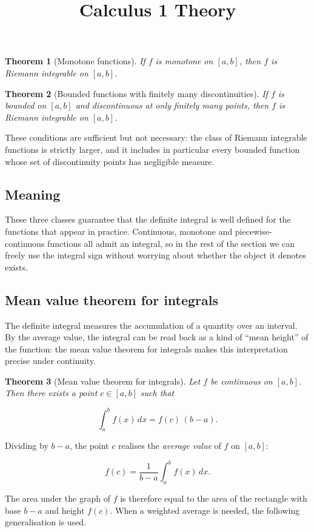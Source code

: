 \documentclass[11pt,a4paper]{article} \usepackage[T1]{fontenc}
\theoremstyle{plain} \newtheorem{theorem}{Theorem} \title{Calculus 1 Theory}
\begin{document}
\begin{theorem}
[Monotone functions] If $f$ is monotone on $[a,b]$, then $f$ is Riemann
integrable on $[a,b]$.
\end{theorem}

\begin{theorem}
[Bounded functions with finitely many discontinuities] If $f$ is bounded on
$[a,b]$ and discontinuous at only finitely many points, then $f$ is Riemann
integrable on $[a,b]$.
\end{theorem}

These conditions are sufficient but not necessary: the class of Riemann
integrable functions is strictly larger, and it includes in particular every
bounded function whose set of discontinuity points has negligible measure.

\subsection*{Meaning}

These three classes guarantee that the definite integral is well defined for
the functions that appear in practice. Continuous, monotone and
piecewise-continuous functions all admit an integral, so in the rest of the
section we can freely use the integral sign without worrying about whether the
object it denotes exists.

\subsection {Mean value theorem for integrals}

The definite integral measures the accumulation of a quantity over an interval.
By the average value, the integral can be read back as a kind of ``mean
height'' of the function: the mean value theorem for integrals makes this
interpretation precise under continuity.

\begin{theorem}
[Mean value theorem for integrals] Let $f$ be continuous on $[a,b]$. Then there
exists a point $c\in[a,b]$ such that

\[
\int_a^b f(x)\,dx = f(c)\,(b-a).
\]

\end{theorem}

Dividing by $b-a$, the point $c$ realises the \emph{average value} of $f$ on
$[a,b]$:

\[
f(c) = \frac{1}{b-a}\int_a^b f(x)\,dx.
\]

The area under the graph of $f$ is therefore equal to the area of the rectangle
with base $b-a$ and height $f(c)$. When a weighted average is needed, the
following generalisation is used.
\end{document}
